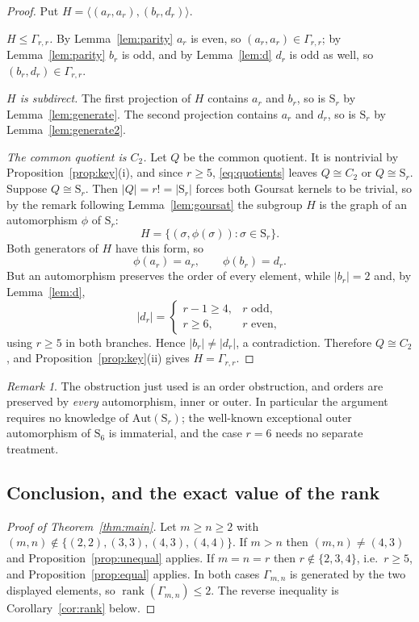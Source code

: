 \documentclass[11pt]{article}
\theoremstyle{plain}
\theoremstyle{definition}
\theoremstyle{remark}
\newtheorem{remark}[theorem]{Remark}
\numberwithin{equation}{section}
\newcommand{\Sym}{\mathrm{S}}
\newcommand{\Gam}{\Gamma}
\DeclareMathOperator{\rank}{rank}
\begin{document}
\begin{proof}
Put $H = \langle (a_r,a_r), (b_r,d_r)\rangle$.

\emph{$H \le \Gam_{r,r}$.} By Lemma~\ref{lem:parity} $a_r$ is even, so $(a_r,a_r) \in
\Gam_{r,r}$; by Lemma~\ref{lem:parity} $b_r$ is odd, and by Lemma~\ref{lem:d} $d_r$ is odd as
well, so $(b_r,d_r) \in \Gam_{r,r}$.

\emph{$H$ is subdirect.} The first projection of $H$ contains $a_r$ and $b_r$, so is $\Sym_r$ by
Lemma~\ref{lem:generate}. The second projection contains $a_r$ and $d_r$, so is $\Sym_r$ by
Lemma~\ref{lem:generate2}.

\emph{The common quotient is $C_2$.} Let $Q$ be the common quotient. It is nontrivial by
Proposition~\ref{prop:key}(i), and since $r \ge 5$, \eqref{eq:quotients} leaves
$Q \cong C_2$ or $Q \cong \Sym_r$. Suppose $Q \cong \Sym_r$. Then
$|Q| = r! = |\Sym_r|$ forces both Goursat kernels to be trivial, so by the remark following
Lemma~\ref{lem:goursat} the subgroup $H$ is the graph of an automorphism $\phi$ of $\Sym_r$:
\[
H = \{(\sigma, \phi(\sigma)) : \sigma \in \Sym_r\}.
\]
Both generators of $H$ have this form, so
\[
\phi(a_r) = a_r, \qquad \phi(b_r) = d_r .
\]
But an automorphism preserves the order of every element, while $|b_r| = 2$ and, by
Lemma~\ref{lem:d},
\[
|d_r| = \begin{cases} r-1 \ge 4, & r \text{ odd},\\ r \ge 6, & r \text{ even},\end{cases}
\]
using $r \ge 5$ in both branches. Hence $|b_r| \ne |d_r|$, a contradiction. Therefore
$Q \cong C_2$, and Proposition~\ref{prop:key}(ii) gives $H = \Gam_{r,r}$.
\end{proof}

\begin{remark}
\label{rem:s6}
The obstruction just used is an order obstruction, and orders are preserved by \emph{every}
automorphism, inner or outer. In particular the argument requires no knowledge of
$\mathrm{Aut}(\Sym_r)$; the well-known exceptional outer automorphism of $\Sym_6$ is immaterial,
and the case $r = 6$ needs no separate treatment.
\end{remark}

\subsection{Conclusion, and the exact value of the rank}

\begin{proof}[Proof of Theorem~\ref{thm:main}]
Let $m \ge n \ge 2$ with $(m,n) \notin \{(2,2),(3,3),(4,3),(4,4)\}$. If $m > n$ then
$(m,n) \ne (4,3)$ and Proposition~\ref{prop:unequal} applies. If $m = n = r$ then
$r \notin\{2,3,4\}$, i.e.\ $r \ge 5$, and Proposition~\ref{prop:equal} applies. In both cases
$\Gam_{m,n}$ is generated by the two displayed elements, so $\rank(\Gam_{m,n}) \le 2$. The
reverse inequality is Corollary~\ref{cor:rank} below.
\end{proof}
\end{document}
